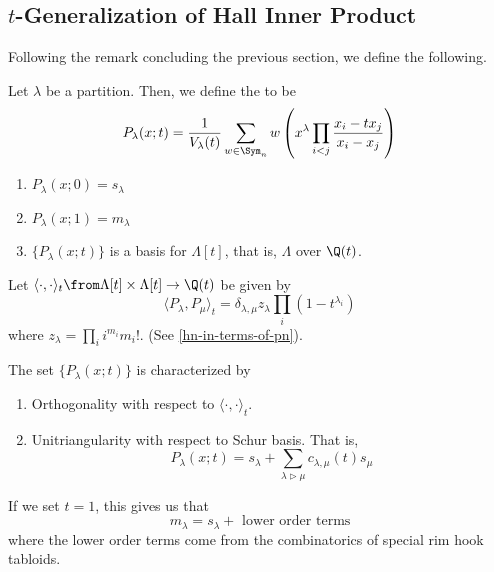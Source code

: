 \documentclass[11pt,leqno,oneside]{amsart}
\numberwithin{thm}{section}
\newcommand{\strictlydominates}{\mathrel{\rhd}}
\newcommand{\sym}{\Lambda}
\begin{document}
\subsection{\(t\)-Generalization of Hall Inner Product}
Following the remark concluding the previous section, we define the
following.
\begin{defn}
  Let \(\lambda\) be a partition. Then, we define the
   to be \[
    P_\lambda(x;t) = \frac{1}{V_\lambda(t)} \sum_{w \in \Sym_n} w
    \left( x^\lambda \prod_{i < j} \frac{x_i-tx_j}{x_i-x_j}\right)
  \]
\end{defn}
\begin{prop}
  \begin{enumerate}
  \item \(P_\lambda(x;0) = s_\lambda\)
  \item \(P_\lambda(x;1) = m_\lambda\)
  \item \(\{P_\lambda(x;t)\}\) is a basis for \(\sym[t]\), that is,
    \(\sym\) over \(\Q(t)\). 
  \end{enumerate}
\end{prop}
\begin{defn}
  Let \(\langle \cdot, \cdot \rangle_t \from \sym[t] \times \sym[t]
  \to \Q(t)\) be given by \[
    \langle P_\lambda, P_\mu \rangle_t = \delta_{\lambda,\mu}
    z_\lambda \prod_{i} (1-t^{\lambda_i})
  \]
  where \(z_\lambda = \prod_i i^{m_i} m_i!\). (See
  \ref{hn-in-terms-of-pn}). 
\end{defn}
\begin{prop}
  The set \(\{P_\lambda(x;t)\}\) is characterized by
  \begin{enumerate}
  \item Orthogonality with respect to \(\langle \cdot, \cdot
    \rangle_t\).
  \item Unitriangularity with respect to Schur basis. That is, \[
      P_\lambda(x;t) = s_\lambda + \sum_{\lambda \strictlydominates
        \mu} c_{\lambda,\mu}(t) s_\mu
    \]
  \end{enumerate}
\end{prop}
\begin{cor}
  If we set \(t=1\), this gives us that \[
    m_\lambda = s_\lambda + \text{ lower order terms}
  \]
  where the lower order terms come from the combinatorics of special
  rim hook tabloids.
\end{cor}
\end{document}
